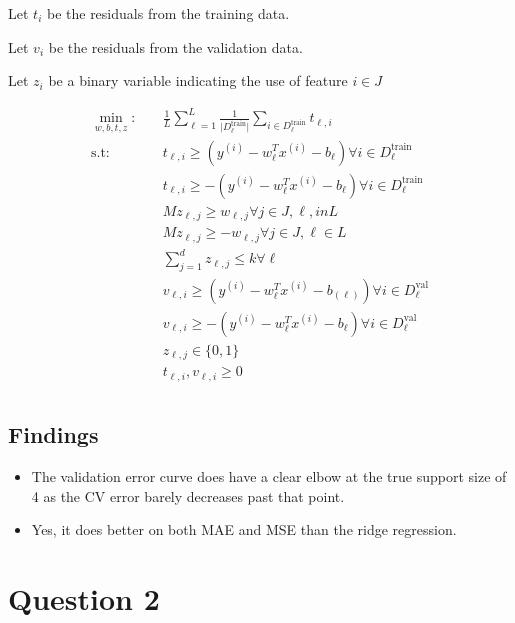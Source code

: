 \documentclass{report}
\begin{document}
Let $t_{i}$ be the residuals from the training data. 

Let $v_{i}$  be the residuals from the validation data. 

Let $z_{i}$ be a binary variable indicating the use of feature $i \in J$ 


\begin{align*}
\min_{w, b, t, z}: \quad & \frac{1}{L} \sum_{\ell = 1}^{L} \frac{1}{\vert D_{\ell}^{\text{train}}\vert} \sum_{i \in D_{\ell}^{\text{train}}}^{} t_{\ell, i}\\
\text{s.t}: \quad &  t_{\ell, i} \ge  (y^{(i)}  - w^{T}_{\ell} x^{(i)} - b_{\ell}) \forall  i \in D_{\ell}^{\text{train}} \\
		  &t_{\ell, i} \ge - (y^{(i)}  - w^{T}_{\ell} x^{(i)} - b_{\ell}) \forall i \in D_{\ell}^{\text{train}} \\
		  & Mz_{\ell, j} \ge w_{\ell, j} \forall j \in J, \ell, in L\\
		  & Mz_{\ell, j} \ge -w_{\ell, j} \forall j\in J, \ell \in  L\\
		  & \sum_{j=1}^{d} z_{\ell, j} \le k \forall \ell \\
		  & v_{\ell, i} \ge  (y^{(i)} - w^{T}_{\ell}x^{(i)} - b_{(\ell)}) \forall i \in D_{\ell}^{\text{val}} \\
		  & v_{\ell, i} \ge -(y^{(i)} - w_{\ell}^{T}x^{(i)} - b_{\ell}) \forall i \in D_{\ell}^{\text{val}}\\
		  &z_{\ell, j} \in \{0,1\}\\
		  &t_{\ell, i}, v_{\ell, i} \ge 0 \\
\end{align*}

\newpage
\subsection{Findings}

\begin{itemize}
	\item The validation error curve does have a clear elbow at the true support size of 4 as the CV error barely decreases past that point. 
	\item Yes, it does better on both MAE and MSE than the ridge regression. 
\end{itemize}


\newpage
\section{Question 2} 
\end{document}
